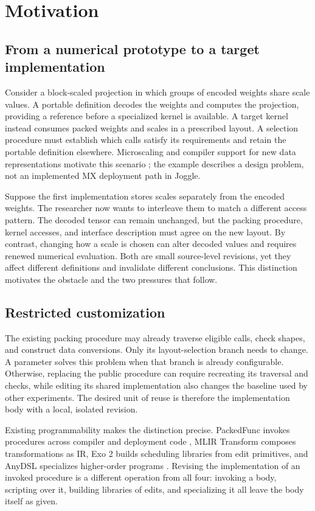 \documentclass[sigplan,anonymous,review]{acmart}
\begin{document}
\section{Motivation}
\label{sec:motivation}
\subsection{From a numerical prototype to a target implementation}
Consider a block-scaled projection in which groups of encoded weights share
scale values. A portable definition decodes the weights and computes the
projection, providing a reference before a specialized kernel is available.
A target kernel instead consumes packed weights and scales in a prescribed
layout. A selection procedure must establish which calls satisfy its
requirements and retain the portable definition elsewhere. Microscaling and
compiler support for new data representations motivate this scenario
\cite{rouhani2023microscaling,wang2024ladder}; the example describes a design
problem, not an implemented MX deployment path in Joggle.

Suppose the first implementation stores scales separately from the encoded
weights. The researcher now wants to interleave them to match a different
access pattern. The decoded tensor can remain unchanged, but the packing
procedure, kernel accesses, and interface description must agree on the new
layout. By contrast, changing how a scale is chosen can alter decoded values
and requires renewed numerical evaluation. Both are small source-level
revisions, yet they affect different definitions and invalidate different
conclusions. This distinction motivates the obstacle and the two pressures that follow.

\subsection{Restricted customization}
The existing packing procedure may already traverse eligible calls, check
shapes, and construct data conversions. Only its layout-selection branch
needs to change. A parameter solves this problem when that branch is already
configurable. Otherwise, replacing the public procedure can require
recreating its traversal and checks, while editing its shared implementation
also changes the baseline used by other experiments. The desired unit of reuse
is therefore the implementation body with a local, isolated revision.

Existing programmability makes the distinction precise. PackedFunc invokes
procedures across compiler and deployment code \cite{tvmRuntimeDocs}, MLIR
Transform composes transformations as IR, Exo 2 builds scheduling libraries
from edit primitives, and AnyDSL specializes higher-order programs
\cite{lucke2025transform,ikarashi2024exo2,leissa2018anydsl}. Revising the
implementation of an invoked procedure is a different operation from all four:
invoking a body, scripting over it, building libraries of edits, and
specializing it all leave the body itself as given.
\end{document}
